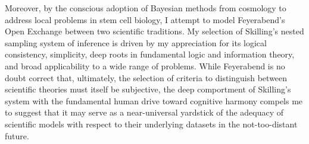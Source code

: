 Moreover, by the conscious adoption of Bayesian methods from cosmology to address local problems in stem cell biology, I attempt to model Feyerabend's Open Exchange between two scientific traditions. My selection of Skilling's nested sampling system of inference is driven by my appreciation for its logical consistency, simplicity, deep roots in fundamental logic and information theory, and broad applicability to a wide range of problems. While Feyerabend is no doubt correct that, ultimately, the selection of criteria to distinguish between scientific theories must itself be subjective, the deep comportment of Skilling's system with the fundamental human drive toward cognitive harmony \cite{Rescher2005} compels me to suggest that it may serve as a near-universal yardstick of the adequacy of scientific models with respect to their underlying datasets in the not-too-distant future.